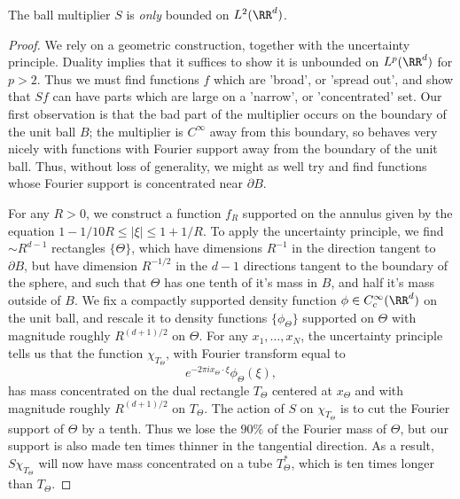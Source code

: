 \begin{theorem}
    The ball multiplier $S$ is \emph{only} bounded on $L^2(\RR^d)$.
\end{theorem}
\begin{proof}
    We rely on a geometric construction, together with the uncertainty principle. Duality implies that it suffices to show it is unbounded on $L^p(\RR^d)$ for $p > 2$. Thus we must find functions $f$ which are 'broad', or 'spread out', and show that $Sf$ can have parts which are large on a 'narrow', or 'concentrated' set. Our first observation is that the bad part of the multiplier occurs on the boundary of the unit ball $B$; the multiplier is $C^\infty$ away from this boundary, so behaves very nicely with functions with Fourier support away from the boundary of the unit ball. Thus, without loss of generality, we might as well try and find functions whose Fourier support is concentrated near $\partial B$.

    For any $R > 0$, we construct a function $f_R$ supported on the annulus given by the equation $1 - 1/10R \leq |\xi| \leq 1 + 1/R$. To apply the uncertainty principle, we find $\sim R^{d-1}$ rectangles $\{ \Theta \}$, which have dimensions $R^{-1}$ in the direction tangent to $\partial B$, but have dimension $R^{-1/2}$ in the $d-1$ directions tangent to the boundary of the sphere, and such that $\Theta$ has one tenth of it's mass in $B$, and half it's mass outside of $B$. We fix a compactly supported density function $\phi \in C_c^\infty(\RR^d)$ on the unit ball, and rescale it to density functions $\{ \phi_\Theta \}$ supported on $\Theta$ with magnitude roughly $R^{(d+1)/2}$ on $\Theta$. For any $x_1,\dots,x_N$, the uncertainty principle tells us that the function $\chi_{T_\Theta}$, with Fourier transform equal to
    \[ e^{-2 \pi i x_\Theta \cdot \xi} \phi_\Theta(\xi), \]
    has mass concentrated on the dual rectangle $T_\Theta$ centered at $x_\Theta$ and with magnitude roughly $R^{(d+1)/2}$ on $T_\Theta$. The action of $S$ on $\chi_{T_\Theta}$ is to cut the Fourier support of $\Theta$ by a tenth. Thus we lose the $90 \%$ of the Fourier mass of $\Theta$, but our support is also made ten times thinner in the tangential direction. As a result, $S \chi_{T_\Theta}$ will now have mass concentrated on a tube $T_\Theta^*$, which is ten times longer than $T_\Theta$.


\end{proof}

